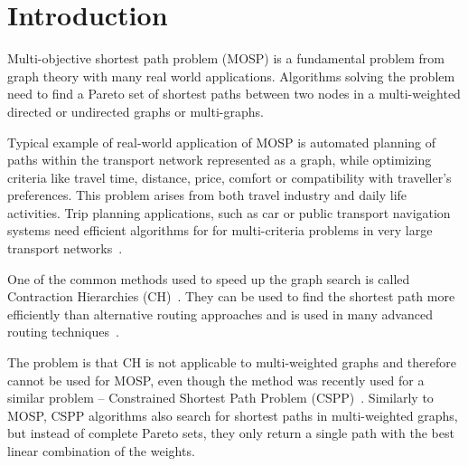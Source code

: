 % 
%  
%  
%  

\section{Introduction}
\label{secIntroduction}

Multi-objective shortest path problem (MOSP) is a fundamental problem from graph theory with many real world applications. Algorithms solving the problem need to find a Pareto set of shortest paths between two nodes in a multi-weighted directed or undirected graphs or multi-graphs. 

Typical example of real-world application of MOSP is automated planning of paths within the transport network represented as a graph, while optimizing criteria like travel time, distance, price, comfort or compatibility with traveller's preferences. This problem arises from both travel industry and daily life activities. Trip planning applications, such as car or public transport navigation systems need efficient algorithms for for multi-criteria problems in very large transport networks~\cite{veneti2016time}. 


One of the common methods used to speed up the graph search is called Contraction Hierarchies (CH)~\cite{geisberger2008contraction}. They can be used to find the shortest path more efficiently than  alternative routing approaches and is used in many advanced routing techniques~\cite{delling2009engineering}. 

The problem is that CH is not applicable to multi-weighted graphs and therefore cannot be used for MOSP, even though the method was recently used for a similar problem -- Constrained Shortest Path Problem (CSPP)~\cite{pugliese2013survey,funke2013polynomial}. Similarly to MOSP, CSPP algorithms also search for shortest paths in multi-weighted graphs, but instead of complete Pareto sets, they only return a single path with the best linear combination of the weights.  

